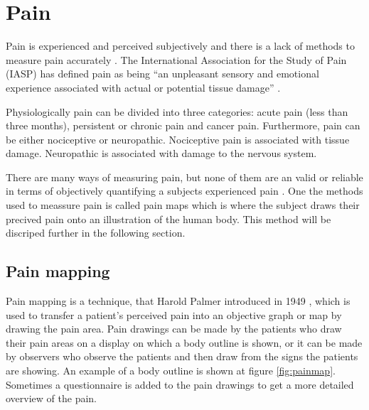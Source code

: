 \section{Pain}
Pain is experienced and perceived subjectively and there is a lack of methods to measure pain accurately \citep{IASP2012, Younger2009}. 
The International Association for the Study of Pain (IASP) has defined pain as being “an unpleasant sensory and emotional experience associated with actual or potential tissue damage” \citep{IASP2012}.

Physiologically pain can be divided into three categories: acute pain (less than three months), persistent or chronic pain and cancer pain. Furthermore, pain can be either nociceptive or neuropathic. Nociceptive pain is associated with tissue damage. Neuropathic is associated with damage to the nervous system.\citep{Briggs2010} 

There are many ways of measuring pain, but none of them are an valid or reliable in terms of objectively quantifying a subjects experienced pain \citep{Younger2009}. One the methods used to meassure pain is called pain maps which is where the subject draws their precived pain onto an illustration of the human body. This method will be discriped further in the following section.   


\subsection{Pain mapping}
Pain mapping is a technique, that Harold Palmer introduced in 1949 \citep{Grunnesjo2006}, which is used to transfer a patient’s perceived pain into an objective graph or map by drawing the pain area. Pain drawings can be made by the patients who draw their pain areas on a display on which a body outline is shown, or it can be made by observers who observe the patients and then draw from the signs the patients are showing. An example of a body outline is shown at figure \ref{fig:painmap}. Sometimes a questionnaire is added to the pain drawings to get a more detailed overview of the pain.\citep{Schott2010}


